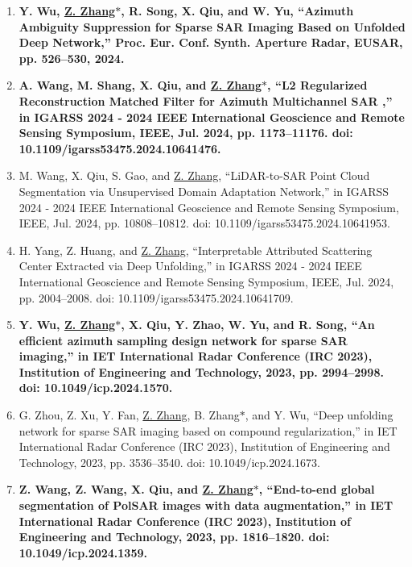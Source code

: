 \documentclass[paper=a4,fontsize=11pt]{scrartcl}
\begin{document}
\begin{enumerate}
	
\item \textbf{Y. Wu, \underline{Z. Zhang$\ast$}, R. Song, X. Qiu, and W. Yu, ``Azimuth Ambiguity Suppression for Sparse SAR Imaging Based on Unfolded Deep Network,'' Proc. Eur. Conf. Synth. Aperture Radar, EUSAR, pp. 526–530, 2024.}

\item \textbf{A. Wang, M. Shang, X. Qiu, and \underline{Z. Zhang$\ast$}, ``L2 Regularized Reconstruction Matched Filter for Azimuth Multichannel SAR ,'' in IGARSS 2024 - 2024 IEEE International Geoscience and Remote Sensing Symposium, IEEE, Jul. 2024, pp. 1173–11176. doi: 10.1109/igarss53475.2024.10641476.}

\item M. Wang, X. Qiu, S. Gao, and \underline{Z. Zhang}, ``LiDAR-to-SAR Point Cloud Segmentation via Unsupervised Domain Adaptation Network,'' in IGARSS 2024 - 2024 IEEE International Geoscience and Remote Sensing Symposium, IEEE, Jul. 2024, pp. 10808–10812. doi: 10.1109/igarss53475.2024.10641953.

\item H. Yang, Z. Huang, and \underline{Z. Zhang}, ``Interpretable Attributed Scattering Center Extracted via Deep Unfolding,'' in IGARSS 2024 - 2024 IEEE International Geoscience and Remote Sensing Symposium, IEEE, Jul. 2024, pp. 2004–2008. doi: 10.1109/igarss53475.2024.10641709.
	
\item \textbf{Y. Wu, \underline{Z. Zhang$\ast$}, X. Qiu, Y. Zhao, W. Yu, and R. Song, ``An efficient azimuth sampling design network for sparse SAR imaging,'' in IET International Radar Conference (IRC 2023), Institution of Engineering and Technology, 2023, pp. 2994–2998. doi: 10.1049/icp.2024.1570.}

\item G. Zhou, Z. Xu, Y. Fan, \underline{Z. Zhang}, B. Zhang$\ast$, and Y. Wu, ``Deep unfolding network for sparse SAR imaging based on compound regularization,'' in IET International Radar Conference (IRC 2023), Institution of Engineering and Technology, 2023, pp. 3536–3540. doi: 10.1049/icp.2024.1673.

\item \textbf{Z. Wang, Z. Wang, X. Qiu, and \underline{Z. Zhang$\ast$}, ``End-to-end global segmentation of PolSAR images with data augmentation,'' in IET International Radar Conference (IRC 2023), Institution of Engineering and Technology, 2023, pp. 1816–1820. doi: 10.1049/icp.2024.1359.}


\end{enumerate}
\end{document}
